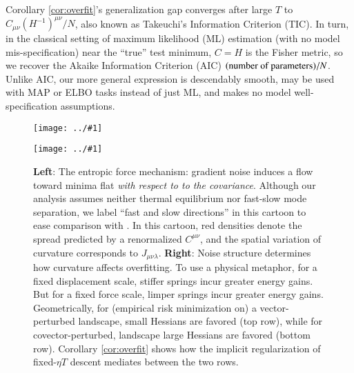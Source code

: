 \documentclass{article}
\theoremstyle{plain}
\theoremstyle{definition}
\newcommand{\plotmooh}[3]{
    \texttt{[image: ../\#1]}
}
\begin{document}
        Corollary \ref{cor:overfit}'s generalization gap converges after
        large $T$ to $C_{\mu\nu}(H^{-1})^{\mu\nu}/N$, also known as Takeuchi's
        Information Criterion (TIC).  In turn, in the classical setting of
        maximum likelihood (ML) estimation (with no model mis-specification)
        near the ``true'' test minimum, $C=H$ is the Fisher metric, so we
        recover the Akaike Information Criterion (AIC) $(\textnormal{number of
        parameters})/N$.  Unlike AIC, our more general expression is
        descendably smooth, may be used with MAP or ELBO tasks instead of just
        ML, and makes no model well-specification assumptions.

        \begin{figure}[h!]
            \centering
            \plotmooh{diagrams/entropic-force-diagram}{}{0.35\columnwidth} 
            \plotmooh{diagrams/springs}{}{0.35\columnwidth}
            \caption{
                {\bf Left}:
                    The entropic force mechanism: gradient noise induces a flow
                    toward minima flat \emph{with respect to to the
                    covariance}.  Although our analysis assumes neither thermal
                    equilibrium nor fast-slow mode separation, we label ``fast
                    and slow directions'' in this cartoon to ease comparison
                    with \citet{we19b}.  In this cartoon, red densities denote
                    the spread predicted by a renormalized $C^{\mu\nu}$, and
                    the spatial variation of curvature corresponds to
                    $J_{\mu\nu\lambda}$. 
                {\bf Right}:
                    Noise structure determines how curvature affects
                    overfitting.  To use a physical metaphor, for a fixed
                    displacement scale, stiffer springs incur greater energy
                    gains.  But for a fixed force scale, limper springs incur
                    greater energy gains.  Geometrically, for (empirical risk
                    minimization on) a vector-perturbed landscape, small
                    Hessians are favored (top row), while for
                    covector-perturbed, landscape large Hessians are favored
                    (bottom row).  Corollary \ref{cor:overfit} shows how the
                    implicit regularization of fixed-$\eta T$ descent mediates
                    between the two rows.
            }
            \label{fig:entropic}
        \end{figure}
\end{document}
